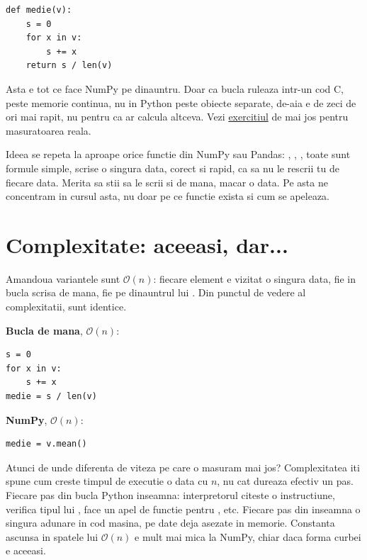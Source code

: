 \begin{verbatim}
def medie(v):
    s = 0
    for x in v:
        s += x
    return s / len(v)
\end{verbatim}

Asta e tot ce face NumPy pe dinauntru. Doar ca bucla ruleaza intr-un cod
C, peste memorie continua, nu in Python peste obiecte separate, de-aia e
de zeci de ori mai rapit, nu pentru ca ar calcula altceva.
Vezi \hyperref[problem:statistici-vectorizate]{exercitiul} de
mai jos pentru masuratoarea reala.

Ideea se repeta la aproape orice functie din NumPy sau Pandas:
, , , toate sunt formule
simple, scrise o singura data, corect si rapid, ca sa nu le rescrii tu de
fiecare data. Merita sa stii sa le scrii si de mana, macar o data. Pe asta
ne concentram in cursul asta, nu doar pe ce functie exista si cum se
apeleaza.

\section{Complexitate: aceeasi, dar...}

Amandoua variantele sunt $\mathcal{O}(n)$: fiecare element e vizitat o
singura data, fie in bucla scrisa de mana, fie pe dinauntrul lui
. Din punctul de vedere al complexitatii, sunt identice.

\begin{minipage}[t]{0.48\linewidth}
\textbf{Bucla de mana}, $\mathcal{O}(n)$:
\begin{verbatim}
s = 0
for x in v:
    s += x
medie = s / len(v)
\end{verbatim}
\end{minipage}
\hfill
\begin{minipage}[t]{0.48\linewidth}
\textbf{NumPy}, $\mathcal{O}(n)$:
\begin{verbatim}
medie = v.mean()
\end{verbatim}
\end{minipage}

Atunci de unde diferenta de viteza pe care o masuram mai jos?
Complexitatea iti spune cum creste timpul de executie o data cu $n$, nu
cat dureaza efectiv un pas. Fiecare pas din bucla Python inseamna:
interpretorul citeste o instructiune, verifica tipul lui , face
un apel de functie pentru \pycode{+=}, etc. Fiecare pas din
 inseamna o singura adunare in cod masina, pe date deja
asezate in memorie. Constanta ascunsa in spatele lui $\mathcal{O}(n)$ e
mult mai mica la NumPy, chiar daca forma curbei e aceeasi.

